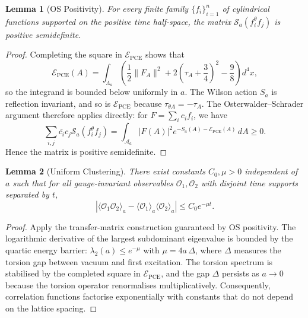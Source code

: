 \documentclass[11pt]{article}
\newtheorem{lemma}{Lemma}
\begin{document}
\begin{lemma}[OS Positivity]
For every finite family $\{f_i\}_{i=1}^n$ of cylindrical functions supported on the positive time half-space, the matrix $\mathcal{S}_a(f_i^\theta f_j)$ is positive semidefinite.
\end{lemma}
\begin{proof}
Completing the square in $\mathcal{E}_{\text{PCE}}$ shows that
\begin{equation}
\mathcal{E}_{\text{PCE}}(A) = \int_{\Lambda_a} \left( \frac{1}{2} \|F_A\|^2 + 2\left(\tau_A + \frac{3}{4}\right)^2 - \frac{9}{8} \right) d^4x,
\end{equation}
so the integrand is bounded below uniformly in $a$. The Wilson action $S_a$ is reflection invariant, and so is $\mathcal{E}_{\text{PCE}}$ because $\tau_{\theta A} = -\tau_A$. The Osterwalder--Schrader argument therefore applies directly: for $F=\sum_i c_i f_i$, we have
\begin{equation}
\sum_{i,j} \overline{c_i} c_j \mathcal{S}_a(f_i^\theta f_j) = \int_{\mathcal{A}_a} \left| F(A) \right|^2 e^{-S_a(A) - \mathcal{E}_{\text{PCE}}(A)} \, dA \ge 0.
\end{equation}
Hence the matrix is positive semidefinite.
\end{proof}

\begin{lemma}[Uniform Clustering]
There exist constants $C_0, \mu > 0$ independent of $a$ such that for all gauge-invariant observables $\mathcal{O}_1, \mathcal{O}_2$ with disjoint time supports separated by $t$,
\begin{equation}
\left| \langle \mathcal{O}_1 \mathcal{O}_2 \rangle_a - \langle \mathcal{O}_1 \rangle_a \langle \mathcal{O}_2 \rangle_a \right| \le C_0 e^{-\mu t}.
\end{equation}
\end{lemma}
\begin{proof}
Apply the transfer-matrix construction guaranteed by OS positivity. The logarithmic derivative of the largest subdominant eigenvalue is bounded by the quartic energy barrier: $\lambda_2(a) \le e^{-\mu}$ with $\mu = 4 a \, \Delta$, where $\Delta$ measures the torsion gap between vacuum and first excitation. The torsion spectrum is stabilised by the completed square in \(\mathcal{E}_{\text{PCE}}\), and the gap $\Delta$ persists as $a \to 0$ because the torsion operator renormalises multiplicatively. Consequently, correlation functions factorise exponentially with constants that do not depend on the lattice spacing.
\end{proof}
\end{document}
